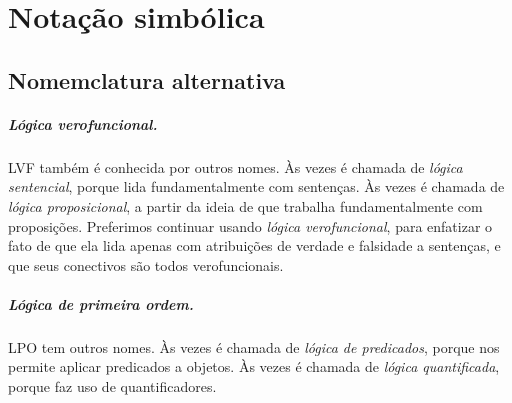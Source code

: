 
\chapter{Notação simbólica}
\label{app.notation}

\section{Nomemclatura alternativa}


\paragraph{Lógica verofuncional.} LVF também é conhecida por outros nomes. Às vezes é chamada de \emph{lógica sentencial}, porque lida fundamentalmente com sentenças. Às vezes é chamada de \emph{lógica proposicional}, a partir da ideia de que trabalha fundamentalmente com proposições. Preferimos continuar usando \emph{lógica verofuncional}, para enfatizar o fato de que ela lida apenas com atribuições de verdade e falsidade a sentenças, e que seus conectivos são todos verofuncionais.


\paragraph{Lógica de primeira ordem.} LPO tem outros nomes. Às vezes é chamada de \emph{lógica de predicados}, porque nos permite aplicar predicados a objetos. Às vezes é chamada de \emph{lógica quantificada}, porque faz uso de quantificadores. 

